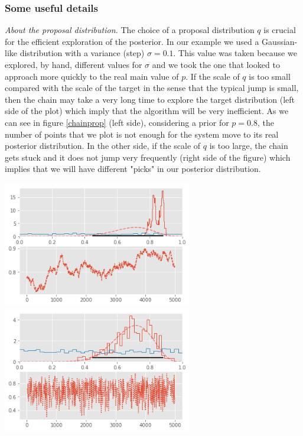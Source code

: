 \documentclass[onecolumn,           %
               showpacs,            %
               preprintnumbers,     %
               aps,                 %
               prl,          	    %
               letterpaper,             %
               superscriptaddress,      %
               nofootinbib,         %
               tightenlines,        %
               floats,floatfix      %
               ,usenatbib,
               ]{revtex4-1}
\begin{document}
\subsubsection{Some useful details}

\textit{About the proposal distribution.} The choice of a proposal distribution $q$ is crucial for the efficient exploration of the posterior. In our example we used a Gaussian-like distribution with a variance (step) $\sigma=0.1$. This value was taken because we explored, by hand, different values for $\sigma$ and we took the one that looked to approach more quickly to the real main value of $p$. If the scale of $q$ is too small compared with the scale of the target in the sense that the typical jump is small, then the chain may take a very long time to explore the target distribution (left side of the plot) which imply that the algorithm will be very inefficient. As we can see in figure \ref{chainprop} (left side), considering a prior for $p=0.8$, the number of points that we plot is not enough for the system move to its real posterior distribution. In the other side, if the scale of $q$ is too large, the chain gets stuck and it does not jump very frequently (right side of the figure) which implies that we will have different "picks" in our posterior distribution.    

\begin{minipage}{\textwidth}
\centering
\includegraphics[height=5.5cm]{chain2.png}
\includegraphics[height=5.5cm]{chain3.png}
\label{chainprop}
\end{minipage}\\ $ $ \\
\end{document}
